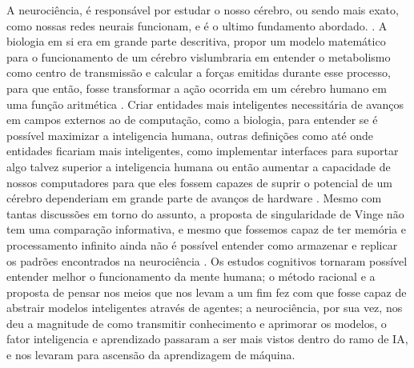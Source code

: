 A neurociência, é responsável por estudar o nosso cérebro, ou sendo mais exato, como nossas redes neurais funcionam, e é o ultimo fundamento abordado. \cite[10]{russell2003artificial}. A biologia em si era em grande parte descritiva, propor um modelo matemático para o funcionamento de um cérebro vislumbraria em entender o metabolismo como centro de transmissão e calcular a forças emitidas durante esse processo, para que então, fosse transformar a ação ocorrida em um cérebro humano em uma função aritmética \cite[1-3]{rashevsky1960mathematical}. Criar entidades mais inteligentes necessitária de avanços em campos externos ao de computação, como a biologia, para entender se é possível maximizar a inteligencia humana, outras definições como até onde entidades ficariam mais inteligentes, como implementar interfaces para suportar algo talvez superior a inteligencia humana ou então aumentar a capacidade de nossos computadores para que eles fossem capazes de suprir o potencial de um cérebro dependeriam em grande parte de avanços de hardware \cite[1-2]{vinge1993coming}. Mesmo com tantas discussões em torno do assunto, a proposta de singularidade de Vinge não tem uma comparação informativa, e mesmo que fossemos capaz de ter memória e processamento infinito ainda não é possível entender como armazenar e replicar os padrões encontrados na neurociência \cite[11-12]{russell2003artificial}. Os estudos cognitivos tornaram possível entender melhor o funcionamento da mente humana; o método racional e a proposta de pensar nos meios que nos levam a um fim fez com que fosse capaz de abstrair modelos inteligentes através de agentes; a neurociência, por sua vez, nos deu a magnitude de como transmitir conhecimento e aprimorar os modelos, o fator inteligencia e aprendizado passaram a ser mais vistos dentro do ramo de IA, e nos levaram para ascensão da aprendizagem de máquina.